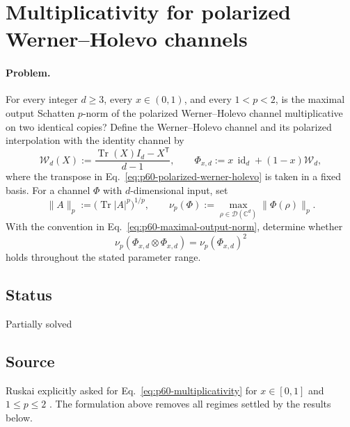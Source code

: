 \section{Multiplicativity for polarized Werner--Holevo channels}
\label{sec:problem-60}

\paragraph{Problem.}
For every integer $d\geq3$, every $x\in(0,1)$, and every $1<p<2$, is the
maximal output Schatten $p$-norm of the polarized Werner--Holevo channel
multiplicative on two identical copies?  Define the Werner--Holevo channel and
its polarized interpolation with the identity channel by
\begin{equation}
  \mathcal W_d(X):=\frac{\operatorname{Tr}(X)I_d-X^{\mathsf T}}{d-1},
  \qquad
  \Phi_{x,d}:=x\,\operatorname{id}_d+(1-x)\mathcal W_d,
  \label{eq:p60-polarized-werner-holevo}
\end{equation}
where the transpose in Eq.~\eqref{eq:p60-polarized-werner-holevo} is taken in
a fixed basis.  For a channel $\Phi$ with $d$-dimensional input, set
\begin{equation}
  \lVert A\rVert_p:=\bigl(\operatorname{Tr}\lvert A\rvert^p\bigr)^{1/p},
  \qquad
  \nu_p(\Phi):=\max_{\rho\in\mathcal D(\mathbb C^d)}
    \lVert\Phi(\rho)\rVert_p.
  \label{eq:p60-maximal-output-norm}
\end{equation}
With the convention in Eq.~\eqref{eq:p60-maximal-output-norm}, determine
whether
\begin{equation}
  \nu_p(\Phi_{x,d}\otimes\Phi_{x,d})
    =\nu_p(\Phi_{x,d})^2
  \label{eq:p60-multiplicativity}
\end{equation}
holds throughout the stated parameter range.

\subsection*{Status}

Partially solved

\subsection*{Source}

Ruskai explicitly asked for Eq.~\eqref{eq:p60-multiplicativity} for
$x\in[0,1]$ and $1\leq p\leq2$
.  The formulation above removes all regimes
settled by the results below.

